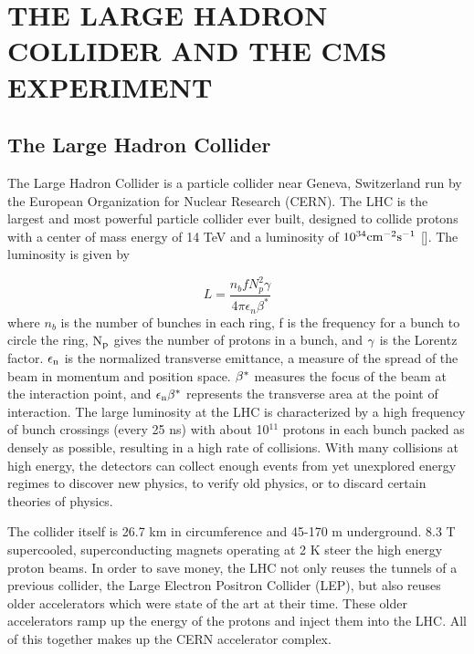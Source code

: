 \chapter{THE LARGE HADRON COLLIDER AND THE CMS EXPERIMENT} \label{lhc-cms}

\section{The Large Hadron Collider}
The Large Hadron Collider is a particle collider near Geneva, Switzerland run by the European Organization for Nuclear Research (CERN). The LHC is the largest and most powerful particle collider ever built, designed to collide protons with a center of mass energy of 14 TeV and a luminosity of $10^{34} {\rm cm^{-2}s^{-1}}$ [\cite{LHC}]. The luminosity is given by

\begin{equation}
L = \frac{n_{b} f N^{2}_{p} \gamma}{4\pi\epsilon_{n}\beta^{*}}
\end{equation}
where $n_{b}$ is the number of bunches in each ring, f is the frequency for a bunch to circle the ring, ${\rm N_{p}}$ gives the number of protons in a bunch, and ${\rm \gamma}$ is the Lorentz factor. ${\rm \epsilon_{n}}$ is the normalized transverse emittance, a measure of the spread of the beam in momentum and position space. ${\rm \beta^{*}}$ measures the focus of the beam at the interaction point, and ${\rm \epsilon_{n}\beta^{*}}$ represents the transverse area at the point of interaction. The large luminosity at the LHC is characterized by a high frequency of bunch crossings (every 25 ns) with about 10$^{11}$ protons in each bunch packed as densely as possible, resulting in a high rate of collisions. With many collisions at high energy, the detectors can collect enough events from yet unexplored energy regimes to discover new physics, to verify old physics, or to discard certain theories of physics. 

The collider itself is 26.7 km in circumference and 45-170 m underground. 8.3 T supercooled, superconducting magnets operating at 2 K steer the high energy proton beams. In order to save money, the LHC not only reuses the tunnels of a previous collider, the Large Electron Positron Collider (LEP), but also reuses older accelerators which were state of the art at their time. These older accelerators ramp up the energy of the protons and inject them into the LHC. All of this together makes up the CERN accelerator complex.

